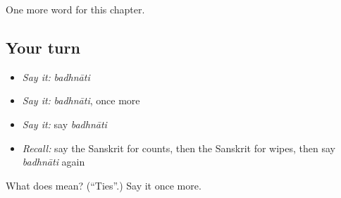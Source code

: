 \begin{grammarlens}[title={What you've built}]
One more word for this chapter.
\end{grammarlens}

\subsection*{Your turn}
\begin{itemize}
\raggedright
  \item \emph{Say it:} \emph{badhnāti}
  \item \emph{Say it:} \emph{badhnāti}, once more
  \item \emph{Say it:} say \emph{badhnāti}
  \item \emph{Recall:} say the Sanskrit for counts, then the Sanskrit for wipes, then say \emph{badhnāti} again
\end{itemize}

\begin{tcolorbox}[breakable,colback=teal!4,colframe=teal!35!black,title={Before you move on}]
What does  mean? (\textquotedblleft{}Ties\textquotedblright{}.) Say it once more.
\end{tcolorbox}

